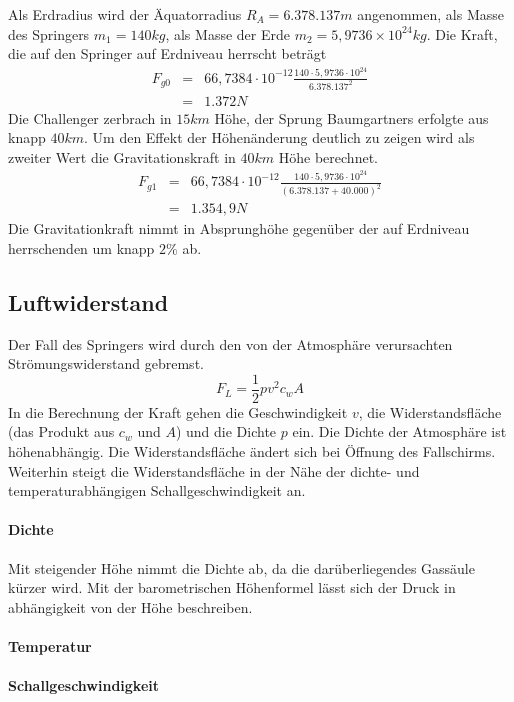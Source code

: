 Als Erdradius wird der Äquatorradius $R_A=6.378.137m$ angenommen, als Masse des Springers $m_1=140kg$, als Masse der Erde $m_2=5,9736\times 10^{24}kg$.
Die Kraft, die auf den Springer auf Erdniveau herrscht beträgt
\begin{eqnarray}
F_{g0} &=& 66,7384\cdot 10^{-12} \frac{140\cdot 5,9736\cdot 10^{24}}{6.378.137^2} \\
 &=& 1.372 N \nonumber
\end{eqnarray}
Die Challenger zerbrach in $15km$ Höhe, der Sprung Baumgartners erfolgte aus knapp $40km$.
Um den Effekt der Höhenänderung deutlich zu zeigen wird als zweiter Wert die Gravitationskraft in $40km$ Höhe berechnet.
\begin{eqnarray}
F_{g1} &=& 66,7384\cdot 10^{-12} \frac{140\cdot 5,9736\cdot 10^{24}}{\left(6.378.137 + 40.000\right)^2} \\
 &=& 1.354,9 N \nonumber
\end{eqnarray}
Die Gravitationkraft nimmt in Absprunghöhe gegenüber der auf Erdniveau herrschenden um knapp $2\%$ ab.

\subsection{Luftwiderstand}
Der Fall des Springers wird durch den von der Atmosphäre verursachten Strömungswiderstand gebremst.
\begin{equation}
F_L=\frac{1}{2}pv^2c_wA
\end{equation}
In die Berechnung der Kraft gehen die Geschwindigkeit $v$, die Widerstandsfläche (das Produkt aus $c_w$ und $A$) und die Dichte $p$ ein.
Die Dichte der Atmosphäre ist höhenabhängig.
Die Widerstandsfläche ändert sich bei Öffnung des Fallschirms.
Weiterhin steigt die Widerstandsfläche in der Nähe der dichte- und temperaturabhängigen Schallgeschwindigkeit an.

\paragraph{Dichte}
Mit steigender Höhe nimmt die Dichte ab, da die darüberliegendes Gassäule kürzer wird.
Mit der barometrischen Höhenformel lässt sich der Druck in abhängigkeit von der Höhe beschreiben.



\paragraph{Temperatur}

\paragraph{Schallgeschwindigkeit}

